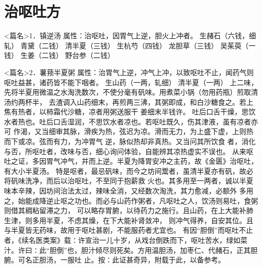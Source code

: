 \documentclass[a4paper,12pt,UTF8,twoside]{ctexbook}
\begin{document}
\chapter{治呕吐方}
<篇名>1．镇逆汤
属性：治呕吐，因胃气上逆，胆火上冲者。 
生赭石（六钱，细轧） 青黛（二钱） 清半夏（三钱） 生杭芍（四钱） 龙胆草（三钱） 吴茱萸（一钱） 
生姜（二钱） 野台参（二钱） 


<篇名>2．薯蓣半夏粥
属性：治胃气上逆，冲气上冲，以致呕吐不止，闻药气则呕吐益甚，诸药皆不能下咽者。 
生山药（一两，轧细） 清半夏（一两） 
上二味，先将半夏用微温之水淘洗数次，不使分毫有矾味。用煮菜小锅（勿用药瓶）煎取清汤约两杯半， 
去渣调入山药细末，再煎两三沸，其粥即成，和白沙糖食之。若上焦有热者，以柿霜代沙糖，凉者用粥送服干 
姜细末半钱许。 
吐后口舌干燥，思饮水者热也。吐后口舌湿润，不思饮水者凉也。若呕吐既久，伤其津液，虽有凉者亦可 
作渴，又当细审其脉，滑疾为热，弦迟为凉。滑而无力，为上盛下虚，上则热而下或凉。弦而有力，为冲胃气 
逆，脉似热却非真热。又当问其所饮食 
者，消化与否，所呕吐者，改味与否，细心询问体验，自能辨其凉热虚实不误也。 
从来呕吐之证，多因胃气冲气，并而上逆。半夏为降胃安冲之主药，故《金匮》治呕吐，有大小半夏汤。 
特是呕者，最忌矾味，而今之坊间鬻者，虽清半夏亦有矾，故必将矾味洗净，而后以治呕吐，不至同于抱薪救 
火也。其多用至一两者，诚以半夏味本辛辣，因坊间治法太过，辣味全消，又经数次淘洗，其力愈减，必额外 
多用之，始能成降逆止呕之功也。而必与山药作粥者，凡呕吐之人，饮汤则易吐，食粥则借其稠粘留滞之力， 
可以略存胃腑，以待药力之施行。且山药，在上大能补肺生津，则多用半夏，不虑其燥，在下大能补肾敛冲， 
则冲气得养，自安其位。且与半夏皆无药味，故用于呕吐甚剧，不能服药者尤宜也。 
有因“胆倒”而呕吐不止者，《续名医类案》载∶许宣治一儿十岁，从戏台倒跌而下，呕吐苦水，绿如菜 
汁。许曰∶此“胆倒”也，胆汁倾尽则死矣。方用温胆汤，加枣仁、代赭石，正其胆腑。可名正胆汤，一服吐 
止。按∶此证甚奇异，附载于此，以备参考。 
\end{document}
